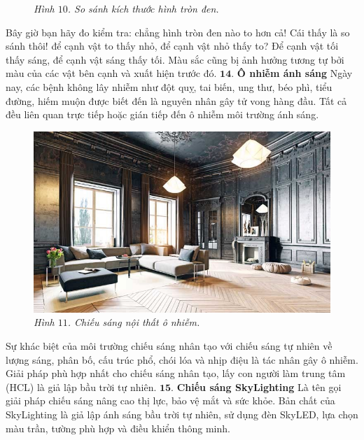 \begin{multicols}{2}
\begin{figure}[H]
		\caption{\small\textit{\color{timhieukhoahoc}Hình $10$. So sánh kích thước hình tròn đen.}}
		\vspace*{-10pt}
	\end{figure}
	Bây giờ bạn hãy đo kiểm tra: chẳng hình tròn đen nào to hơn cả! 
	\vskip 0.1cm
	Cái thấy là so sánh thôi! để cạnh vật to thấy nhỏ, để cạnh vật nhỏ thấy to? Để cạnh vật tối thấy sáng, để cạnh vật sáng thấy tối. Màu sắc cũng bị ảnh hưởng tương tự bởi màu của các vật bên cạnh và xuất hiện trước đó.  
	\vskip 0.1cm
	$\pmb{14.}$ \textbf{\color{timhieukhoahoc}Ô nhiễm ánh sáng}
	\vskip 0.1cm
	Ngày nay, các bệnh không lây nhiễm như đột quỵ, tai biến, ung thư, béo phì, tiểu đường, hiếm muộn được biết đến là nguyên nhân gây tử vong hàng đầu. Tất cả đều liên quan trực tiếp hoặc gián tiếp đến ô nhiễm môi trường ánh sáng. 
	\begin{figure}[H]
		\vspace*{-5pt}
		\centering
		\captionsetup{labelformat= empty, justification=centering}
		\includegraphics[width= 1\linewidth]{11}
		\caption{\small\textit{\color{timhieukhoahoc}Hình $11$. Chiếu sáng nội thất ô nhiễm.}}
		\vspace*{-10pt}
	\end{figure}
	Sự khác biệt của môi trường chiếu sáng nhân tạo với chiếu sáng tự nhiên về lượng sáng, phân bố, cấu trúc phổ, chói lóa và nhịp điệu là tác nhân gây ô nhiễm. Giải pháp phù hợp nhất cho chiếu sáng nhân tạo, lấy con người làm trung tâm (HCL) là giả lập bầu trời tự nhiên.   
	\vskip 0.1cm
	$\pmb{15.}$ \textbf{\color{timhieukhoahoc}Chiếu sáng SkyLighting} 
	\vskip 0.1cm
	Là tên gọi giải pháp chiếu sáng nâng cao thị lực, bảo vệ mắt và sức khỏe.
	Bản chất của SkyLighting là giả lập ánh sáng bầu trời tự nhiên, sử dụng đèn SkyLED, lựa chọn màu trần, tường phù hợp và điều khiển thông minh. 

\end{multicols}
